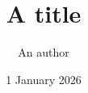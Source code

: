 \documentclass[aspectratio=2013]{beamer}
\title{A title}
\author{An author}
\date{1 January 2026}
\begin{document}
\frame{\titlepage}
\end{document}
